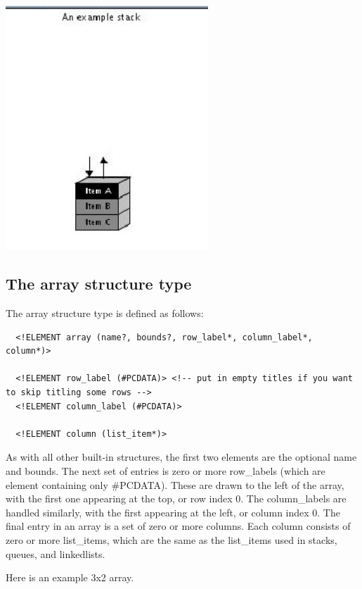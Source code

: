 \documentclass[11pt,letterpaper]{book}
\begin{document}
\begin{center}
  \includegraphics[width=3in]{howto_graphics/stack.eps}
\end{center}


\subsection{The array structure type}


The array structure type is defined as follows:

\footnotesize \begin{verbatim}
  <!ELEMENT array (name?, bounds?, row_label*, column_label*, column*)>

  <!ELEMENT row_label (#PCDATA)> <!-- put in empty titles if you want to skip titling some rows -->
  <!ELEMENT column_label (#PCDATA)>

  <!ELEMENT column (list_item*)>
\end{verbatim} \normalsize
  
  As with all other built-in structures, the first two elements are
  the optional name and bounds.  The next set of entries is zero or
  more row\_labels (which are element containing only \#PCDATA). These
  are drawn to the left of the array, with the first one appearing at
  the top, or row index 0. The column\_labels are handled similarly,
  with the first appearing at the left, or column index 0. The final
  entry in an array is a set of zero or more columns. Each column
  consists of zero or more list\_items, which are the same as the
  list\_items used in stacks, queues, and linkedlists.

Here is an example 3x2 array.
\end{document}
